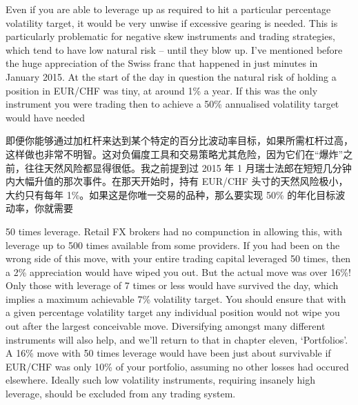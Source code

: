 
\begin{englishblock} Even if you are able to leverage up as required to hit a particular percentage volatility target, it would be very unwise if excessive gearing is needed. This is particularly problematic for negative skew instruments and trading strategies, which tend to have low natural risk -- until they blow up. I've mentioned before the huge appreciation of the Swiss franc that happened in just minutes in January 2015. At the start of the day in question the natural risk of holding a position in EUR/CHF was tiny, at around 1\% a year. If this was the only instrument you were trading then to achieve a 50\% annualised volatility target would have needed \end{englishblock}

\begin{chineseblock}即便你能够通过加杠杆来达到某个特定的百分比波动率目标，如果所需杠杆过高，这样做也非常不明智。这对负偏度工具和交易策略尤其危险，因为它们在“爆炸”之前，往往天然风险都显得很低。我之前提到过 2015 年 1 月瑞士法郎在短短几分钟内大幅升值的那次事件。在那天开始时，持有 EUR/CHF 头寸的天然风险极小，大约只有每年 1\%。如果这是你唯一交易的品种，那么要实现 50\% 的年化目标波动率，你就需要\end{chineseblock}

\bipairgap

\begin{englishblock} 50 times leverage. Retail FX brokers had no compunction in allowing this, with leverage up to 500 times available from some providers. If you had been on the wrong side of this move, with your entire trading capital leveraged 50 times, then a 2\% appreciation would have wiped you out. But the actual move was over 16\%! Only those with leverage of 7 times or less would have survived the day, which implies a maximum achievable 7\% volatility target. You should ensure that with a given percentage volatility target any individual position would not wipe you out after the largest conceivable move. Diversifying amongst many different instruments will also help, and we'll return to that in chapter eleven, ‘Portfolios'. A 16\% move with 50 times leverage would have been just about survivable if EUR/CHF was only 10\% of your portfolio, assuming no other losses had occured elsewhere. Ideally such low volatility instruments, requiring insanely high leverage, should be excluded from any trading system. \end{englishblock}


